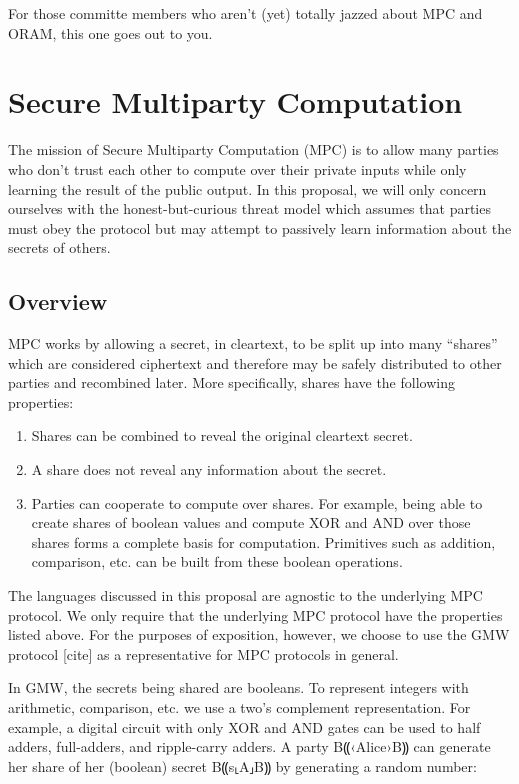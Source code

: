 \documentclass{report}
\newcommand{\alice}{B⸨‹Alice›B⸩\xspace}
\newcommand{\alices}[1]{B⸨#1⸤A⸥B⸩}
\newcommand{\aliceSec}{\alices{s}\xspace}
\begin{document}
For those committe members who aren't (yet) totally jazzed about MPC and ORAM, this one goes out to you.

\section{Secure Multiparty Computation}

The mission of Secure Multiparty Computation (MPC) is to allow many parties who don't trust each
other to compute over their private inputs while only learning the result of the public output.
In this proposal, we will only concern ourselves with the honest-but-curious threat model which
assumes that parties must obey the protocol but may attempt to passively learn information about the secrets of others.

\subsection{Overview}

MPC works by allowing a secret, in cleartext, to be split up into many ``shares'' which are considered ciphertext
and therefore may be safely distributed to other parties and recombined later. More specifically, shares have the following properties:
\begin{enumerate}
\item Shares can be combined to reveal the original cleartext secret.
\item A share does not reveal any information about the secret.
\item Parties can cooperate to compute over shares. For example, being able to create shares of boolean values
  and compute XOR and AND over those shares forms a complete basis for computation. Primitives such as addition,
  comparison, etc. can be built from these boolean operations.
\end{enumerate}

The languages discussed in this proposal are agnostic to the underlying MPC protocol. We only require that the underlying MPC protocol
have the properties listed above. For the purposes of exposition, however, we choose to use the GMW protocol [cite] as a
representative for MPC protocols in general.

In GMW, the secrets being shared are booleans. To represent integers with arithmetic, comparison, etc. we use a two's
complement representation. For example, a digital circuit with only XOR and AND gates can be used to half adders,
full-adders, and ripple-carry adders. A party \alice can generate her share of her (boolean) secret \aliceSec by
generating a random number:
\end{document}

